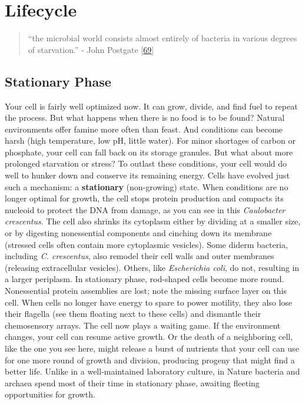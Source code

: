 \documentclass[]{tufte-book}
\begin{document}
\hypertarget{lifecycle}{%
\chapter{Lifecycle}\label{lifecycle}}

\begin{quote}
``the microbial world consists almost entirely of bacteria in various degrees of starvation.''
- John Postgate {[}\protect\hyperlink{ref-postgate1994}{69}{]}
\end{quote}

\hypertarget{stationary-phase}{%
\section{Stationary Phase}\label{stationary-phase}}

Your cell is fairly well optimized now. It can grow, divide, and find fuel to repeat the process. But what happens when there is no food is to be found? Natural environments offer famine more often than feast. And conditions can become harsh (high temperature, low pH, little water). For minor shortages of carbon or phosphate, your cell can fall back on its storage granules. But what about more prolonged starvation or stress? To outlast these conditions, your cell would do well to hunker down and conserve its remaining energy. Cells have evolved just such a mechanism: a \textbf{stationary} (non-growing) state. When conditions are no longer optimal for growth, the cell stops protein production and compacts its nucleoid to protect the DNA from damage, as you can see in this \emph{Caulobacter crescentus}. The cell also shrinks its cytoplasm either by dividing at a smaller size, or by digesting nonessential components and cinching down its membrane (stressed cells often contain more cytoplasmic vesicles). Some diderm bacteria, including \emph{C. crescentus}, also remodel their cell walls and outer membranes (releasing extracellular vesicles). Others, like \emph{Escherichia coli}, do not, resulting in a larger periplasm. In stationary phase, rod-shaped cells become more round. Nonessential protein assemblies are lost; note the missing surface layer on this cell. When cells no longer have energy to spare to power motility, they also lose their flagella (see them floating next to these cells) and dismantle their chemosensory arrays. The cell now plays a waiting game. If the environment changes, your cell can resume active growth. Or the death of a neighboring cell, like the one you see here, might release a burst of nutrients that your cell can use for one more round of growth and division, producing progeny that might find a better life. Unlike in a well-maintained laboratory culture, in Nature bacteria and archaea spend most of their time in stationary phase, awaiting fleeting opportunities for growth.
\end{document}
